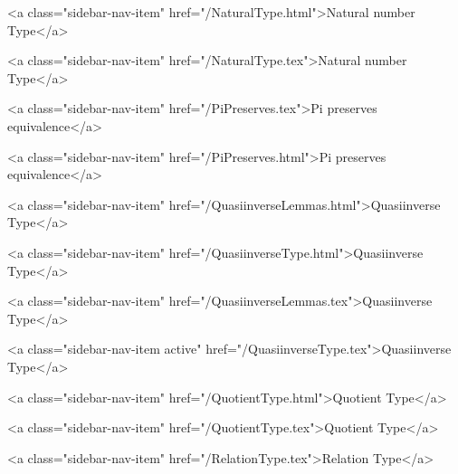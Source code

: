       
        
          <a class="sidebar-nav-item" href="/NaturalType.html">Natural number Type</a>
        
      
    
      
        
          <a class="sidebar-nav-item" href="/NaturalType.tex">Natural number Type</a>
        
      
    
      
        
          <a class="sidebar-nav-item" href="/PiPreserves.tex">Pi preserves equivalence</a>
        
      
    
      
        
          <a class="sidebar-nav-item" href="/PiPreserves.html">Pi preserves equivalence</a>
        
      
    
      
        
          <a class="sidebar-nav-item" href="/QuasiinverseLemmas.html">Quasiinverse Type</a>
        
      
    
      
        
          <a class="sidebar-nav-item" href="/QuasiinverseType.html">Quasiinverse Type</a>
        
      
    
      
        
          <a class="sidebar-nav-item" href="/QuasiinverseLemmas.tex">Quasiinverse Type</a>
        
      
    
      
        
          <a class="sidebar-nav-item active" href="/QuasiinverseType.tex">Quasiinverse Type</a>
        
      
    
      
        
          <a class="sidebar-nav-item" href="/QuotientType.html">Quotient Type</a>
        
      
    
      
        
          <a class="sidebar-nav-item" href="/QuotientType.tex">Quotient Type</a>
        
      
    
      
        
          <a class="sidebar-nav-item" href="/RelationType.tex">Relation Type</a>
        
